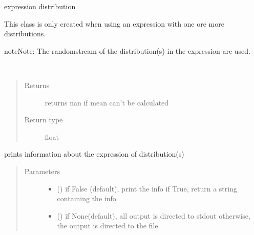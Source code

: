 \documentclass[letterpaper,10pt,english]{sphinxmanual}
\begin{document}
\begin{fulllineitems}
\label{\detokenize{Reference:salabim._Expression}}
expression distribution

This class is only created when using an expression with one ore more distributions.

\begin{sphinxadmonition}{note}{Note:}
The randomstream of the distribution(s) in the expression are used.
\end{sphinxadmonition}

\begin{fulllineitems}
\label{\detokenize{Reference:salabim._Expression.mean}}~\begin{quote}\begin{description}
\item[{Returns}] \leavevmode
{} \textendash{} returns nan if mean can’t be calculated

\item[{Return type}] \leavevmode
float

\end{description}\end{quote}

\end{fulllineitems}


\begin{fulllineitems}
\label{\detokenize{Reference:salabim._Expression.print_info}}
prints information about the expression of distribution(s)
\begin{quote}\begin{description}
\item[{Parameters}] \leavevmode\begin{itemize}
\item {} 
 () \textendash{} if False (default), print the info
if True, return a string containing the info

\item {} 
 () \textendash{} if None(default), all output is directed to stdout 
otherwise, the output is directed to the file


\end{itemize}
\end{description}
\end{quote}
\end{fulllineitems}
\end{fulllineitems}
\end{document}
